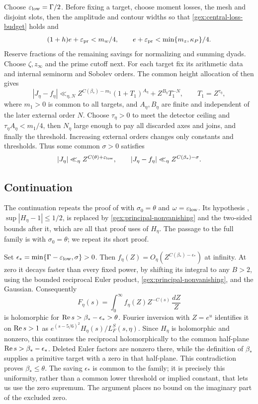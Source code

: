 Choose \(\varepsilon_{\rm low}=\Gamma/2\). Before fixing a target, choose moment
losses, the mesh and disjoint slots, then the amplitude and contour
widths so that \eqref{gex:central-loss-budget} holds and
\[
 (1+h)e+\varepsilon_{\rm pr}<m_w/4,\qquad
 e+\varepsilon_{\rm pr}<\min\{m_z,\kappa_P\}/4.
\]
Reserve fractions of the remaining savings for normalizing and
summing dyads. Choose \(\zeta,z_\infty\) and the prime cutoff next.
For each target fix its arithmetic data and internal seminorm and
Sobolev orders. The common height allocation of
\cite[Sections 10 and 20.6]{OAI26} then gives
\[
 |J_\eta-f_\eta|\ll_{\eta,N}
 Z^{C(\beta_*)-m_1}(1+T_1)^{A_\eta}+Z^{B_\eta}T_1^{-N},
 \qquad T_1=Z^{\tau_\eta} ,
\]
where \(m_1>0\) is common to all targets, and \(A_\eta,B_\eta\)
are finite and independent of the later external order \(N\).
Choose \(\tau_\eta>0\) to meet the detector ceiling and
\(\tau_\eta A_\eta<m_1/4\), then \(N_\eta\) large enough to pay
all discarded axes and joins, and finally the threshold.
Increasing external orders changes only constants and thresholds.
Thus some common \(\sigma>0\) satisfies
\begin{equation}\label{gex:common-low-high}
 |J_\eta|\ll_\eta Z^{C(\theta)+\varepsilon_{\rm low}},\qquad
 |J_\eta-f_\eta|\ll_\eta Z^{C(\beta_*)-\sigma}.
\end{equation}

\subsection{Continuation}

The continuation repeats the proof of \cite[Proposition 2.1]{OAI26}
with \(\sigma_0=\theta\) and \(\omega=\varepsilon_{\rm low}\). Its
hypothesis \cite[(2.2)]{OAI26}, \(\sup|H_\eta-1|\le1/2\), is replaced
by \eqref{gex:principal-nonvanishing} and the two-sided bounds after it,
which are all that proof uses of \(H_\eta\).
The passage to the full family is \cite[Proposition 11.3]{OAI26} with
\(\sigma_0=\theta\); we repeat its short proof.

Set \(\epsilon_*=\min\{\Gamma-\varepsilon_{\rm low},\sigma\}>0\).
Then \(f_\eta(Z)=O_\eta(Z^{C(\beta_*)-\epsilon_*})\) at infinity.
At zero it decays faster than every fixed power, by shifting its
integral to any \(B>2\), using the bounded reciprocal Euler product,
\eqref{gex:principal-nonvanishing}, and the Gaussian.
Consequently
\[
 F_\eta(s)=\int_0^\infty f_\eta(Z)Z^{-C(s)}\,\frac{dZ}{Z}
\]
is holomorphic for \(\operatorname{Re} s>\beta_*-\epsilon_*>\theta\).
Fourier inversion with \(Z=e^u\) identifies it on \(\operatorname{Re} s>1\)
as \(e^{(s-5/6)^2}H_\eta(s)/L_F^S(s,\eta)\).
Since \(H_\eta\) is holomorphic and nonzero, this continues the reciprocal
holomorphically to the common half-plane
\(\operatorname{Re} s>\beta_*-\epsilon_*\).
Deleted Euler factors are nonzero there, while the definition of
\(\beta_*\) supplies a primitive target with a zero in that
half-plane. This contradiction proves \(\beta_*\le\theta\).
The saving \(\epsilon_*\) is common to the family; it is precisely
this uniformity, rather than a common lower threshold or implied
constant, that lets us use the zero supremum. The argument places
no bound on the imaginary part of the excluded zero.

